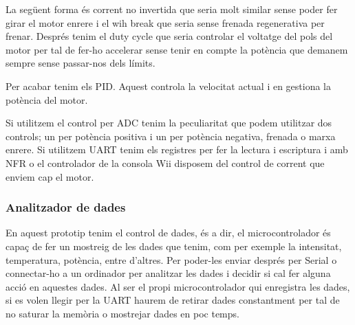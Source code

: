  La següent forma és corrent no invertida que seria molt similar sense poder fer girar el motor enrere i el wih break que seria sense frenada regenerativa per frenar. Després tenim el duty cycle que seria controlar el voltatge del pols del motor per tal de fer-ho accelerar sense tenir en compte la potència que demanem sempre sense passar-nos dels límits.
 
 Per acabar tenim els PID. Aquest controla la velocitat actual i en gestiona la potència del motor. 
 
 Si utilitzem el control per ADC tenim la peculiaritat que podem utilitzar dos controls; un per potència positiva i un per potència negativa, frenada o marxa enrere. Si utilitzem UART tenim els registres per fer la lectura i escriptura i amb NFR o el controlador de la consola Wii disposem del control de corrent que enviem cap el motor.
      
\subsubsection{Analitzador de dades}
En aquest prototip tenim el control de dades, és a dir, el microcontrolador és capaç de fer un mostreig de les dades que tenim, com per exemple la intensitat, temperatura, potència, entre d'altres. Per poder-les enviar després per Serial o connectar-ho a un ordinador per analitzar les dades i decidir si cal fer alguna acció en aquestes dades. Al ser el propi microcontrolador qui enregistra les dades, si es volen llegir per la UART haurem de retirar dades constantment per tal de no saturar la memòria o mostrejar dades en poc temps.      
      
